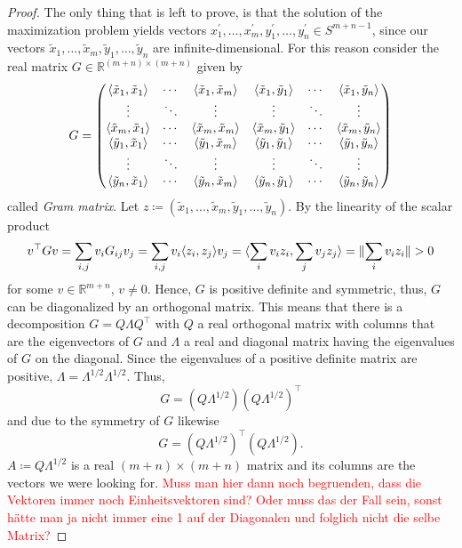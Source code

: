 \begin{proof}
	The only thing that is left to prove, is that the solution of the maximization problem yields vectors $x_1^\prime,\dots,x_m^\prime, y_1^\prime,\dots,y_n^\prime\in S^{m+n-1}$, since our vectors $\tilde{x}_1,\dots,\tilde{x}_m,\tilde{y}_1,\dots,\tilde{y}_n$ are infinite-dimensional. 
	For this reason consider the real matrix $G\in\mathbb{R}^{(m+n)\times(m+n)}$ given by
	\begin{equation}
		G=\begin{pmatrix}
			\langle{\tilde{x}_1},{\tilde{x}_1}\rangle & \cdots & \langle{\tilde{x}_1},{\tilde{x}_m}\rangle& \langle{\tilde{x}_1},{\tilde{y}_1}\rangle & \cdots & \langle{\tilde{x}_1},{\tilde{y}_n}\rangle \\
			 \vdots		& \ddots	& \vdots & \vdots & \ddots & \vdots\\
			 \langle{\tilde{x}_m},{\tilde{x}_1}\rangle & \cdots & \langle{\tilde{x}_m},{\tilde{x}_m}\rangle& \langle{\tilde{x}_m},{\tilde{y}_1}\rangle & \cdots & \langle{\tilde{x}_m},{\tilde{y}_n}\rangle \\
			\langle{\tilde{y}_1},{\tilde{x}_1}\rangle & \cdots & \langle{\tilde{y}_1},{\tilde{x}_m}\rangle& \langle{\tilde{y}_1},{\tilde{y}_1}\rangle & \cdots & \langle{\tilde{y}_1},{\tilde{y}_n}\rangle \\
			 \vdots		& \ddots	& \vdots& \vdots & \ddots & \vdots\\
			 \langle{\tilde{y}_n},{\tilde{x}_1}\rangle & \cdots & \langle{\tilde{y}_n},{\tilde{x}_m}\rangle& \langle{\tilde{y}_n},{\tilde{y}_1}\rangle & \cdots & \langle{\tilde{y}_n},{\tilde{y}_n}\rangle 
		\end{pmatrix}
	\end{equation}
	called \emph{Gram matrix}. Let $z\coloneqq (\tilde{x}_1,\dots,\tilde{x}_m,\tilde{y}_1,\dots,\tilde{y}_n)$. By the linearity of the scalar product
	\begin{align*}
		v^\top G v = \sum_{i,j} v_i G_{ij} v_j 
		= \sum_{i,j} v_i \langle{z_i},{z_j}\rangle v_j 
		= \langle{\sum_i v_i z_i},{\sum_j v_j z_j}\rangle 
		=  \Vert {\sum_i v_i z_i} \Vert > 0
	\end{align*}
	for some $v\in\mathbb{R}^{m+n}$, $v\neq 0$. Hence, $G$ is positive definite and symmetric, thus, $G$ can be diagonalized by an orthogonal matrix. This means that there is a decomposition $G=Q\Lambda Q^\top$ with $Q$ a real orthogonal matrix with columns that are the eigenvectors of $G$ and $\Lambda$ a real and diagonal matrix having the eigenvalues of $G$ on the diagonal. Since the eigenvalues of a positive definite matrix are positive, $\Lambda=\Lambda^{1/2}\Lambda^{1/2}$. Thus,
	\[
		G=(Q\Lambda^{1/2})(Q\Lambda^{1/2})^\top		
	\]
	and due to the symmetry of $G$ likewise
	\[
		G=(Q\Lambda^{1/2})^\top(Q\Lambda^{1/2}).	
	\]
	$A\coloneqq Q\Lambda^{1/2}$ is a real $(m+n)\times (m+n)$ matrix and its columns are the vectors we were looking for.
	\textcolor{red}{Muss man hier dann noch begruenden, dass die Vektoren immer noch Einheitsvektoren sind? Oder muss das der Fall sein, sonst hätte man ja nicht immer eine 1 auf der Diagonalen und folglich nicht die selbe Matrix?}
\end{proof}
